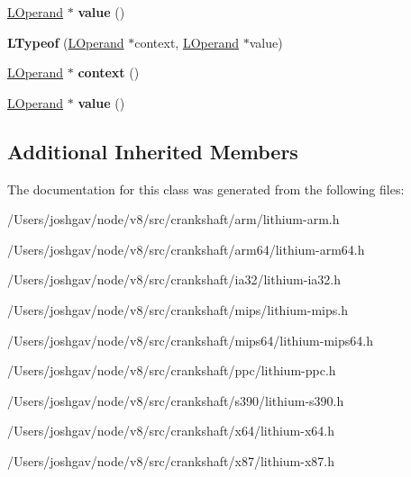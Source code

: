 \begin{DoxyCompactItemize}
\item 
\hyperlink{classv8_1_1internal_1_1_l_operand}{L\+Operand} $\ast$ {\bfseries value} ()\hypertarget{classv8_1_1internal_1_1_l_typeof_a49c70d90eb3e1c5f30168e1973b3dfc7}{}\label{classv8_1_1internal_1_1_l_typeof_a49c70d90eb3e1c5f30168e1973b3dfc7}

\item 
{\bfseries L\+Typeof} (\hyperlink{classv8_1_1internal_1_1_l_operand}{L\+Operand} $\ast$context, \hyperlink{classv8_1_1internal_1_1_l_operand}{L\+Operand} $\ast$value)\hypertarget{classv8_1_1internal_1_1_l_typeof_a6d44ed214dc9ea6151f205dcd7fdc87b}{}\label{classv8_1_1internal_1_1_l_typeof_a6d44ed214dc9ea6151f205dcd7fdc87b}

\item 
\hyperlink{classv8_1_1internal_1_1_l_operand}{L\+Operand} $\ast$ {\bfseries context} ()\hypertarget{classv8_1_1internal_1_1_l_typeof_a206cb43ad06486cd45c6cdbe8a02f7bf}{}\label{classv8_1_1internal_1_1_l_typeof_a206cb43ad06486cd45c6cdbe8a02f7bf}

\item 
\hyperlink{classv8_1_1internal_1_1_l_operand}{L\+Operand} $\ast$ {\bfseries value} ()\hypertarget{classv8_1_1internal_1_1_l_typeof_a49c70d90eb3e1c5f30168e1973b3dfc7}{}\label{classv8_1_1internal_1_1_l_typeof_a49c70d90eb3e1c5f30168e1973b3dfc7}

\end{DoxyCompactItemize}
\subsection*{Additional Inherited Members}


The documentation for this class was generated from the following files\+:\begin{DoxyCompactItemize}
\item 
/\+Users/joshgav/node/v8/src/crankshaft/arm/lithium-\/arm.\+h\item 
/\+Users/joshgav/node/v8/src/crankshaft/arm64/lithium-\/arm64.\+h\item 
/\+Users/joshgav/node/v8/src/crankshaft/ia32/lithium-\/ia32.\+h\item 
/\+Users/joshgav/node/v8/src/crankshaft/mips/lithium-\/mips.\+h\item 
/\+Users/joshgav/node/v8/src/crankshaft/mips64/lithium-\/mips64.\+h\item 
/\+Users/joshgav/node/v8/src/crankshaft/ppc/lithium-\/ppc.\+h\item 
/\+Users/joshgav/node/v8/src/crankshaft/s390/lithium-\/s390.\+h\item 
/\+Users/joshgav/node/v8/src/crankshaft/x64/lithium-\/x64.\+h\item 
/\+Users/joshgav/node/v8/src/crankshaft/x87/lithium-\/x87.\+h\end{DoxyCompactItemize}
